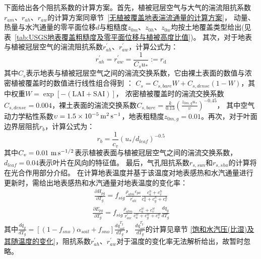 下面给出各个阻抗系数的计算方案。首先，植被冠层空气与大气的湍流阻抗系数$r_{am}$、$r_{ah}$、$r_{aw}$的计算方案同章节~\ref{无植被覆盖地表湍流通量的计算方案}，
动量、热量与水汽通量的零平面位移$d$与粗糙度$z_{0m}$、$z_{0h}$、$z_{0w}$均按土地覆盖类型给出(见
表~\ref{tab:USGS地表覆盖粗糙度及零平面位移与植被高度比值})。
其次，对于地表与植被冠层空气的湍流阻抗系数$r_{ah}^\prime$、$r_{aw}^\prime$，计算公式为：
\begin{equation}
r_{a h}^{\prime}=r_{a w}^{\prime}=\frac{1}{C_{s} u_{*}}:=r_{\mathrm{d}}
\end{equation}
其中$C_s$表示地表与植被冠层空气之间的湍流交换系数，它由裸土表面的数值与浓密植被覆盖时的数值进行线性组合得到 \citep{zeng2005vegetation}：
$C_s=C_{s,bare}W+C_{s,dense}\left(1-W\right)$，其中权重$W=\exp {\left[-(\text{LAI}+\text{SAI})\right]}$，
浓密植被覆盖时的湍流交换系数$C_{s,dense}=0.004$，裸土表面的湍流交换系数$C_{s,bare}=\frac{k}{0.13}\left(\frac{z_{0m,g}u_\ast}{\upsilon}\right)^{-0.45}$，
其中空气动力学粘性系数$\upsilon=1.5\times{10}^{-5}\,\rm m^2\,s^{-1}$，地表粗糙度$z_{0m,g}=0.01$。再次，对于叶面边界层阻抗$r_b$，计算公式为：
\begin{equation}
r_{b}=\frac{1}{c_{v}}\left(u_{*} / d_{{leaf }}\right)^{-0.5}
\end{equation}
其中$C_v=0.01\ \rm m\,s^{-1/2}$表示植被表面与植被冠层空气之间的湍流交换系数，$d_{leaf}=0.04$表示叶片在风向的特征值。
最后，气孔阻抗系数$r_{s,sun}$和$r_{s,sha}$的计算将在光合作用部分介绍。
在计算地表温度并基于该温度对地表感热和水汽通量进行更新时，需给出地表感热和水汽通量对地表温度的变化率：
\begin{equation}
\begin{array}{c} \frac{\partial H_{p g}}{\partial T_{g}}=f_{sig} \frac{\rho_{atm} c_{p a}}{r_{a h}^{\prime}} 
     \frac{c_{a}^{h}+c_{v}^{h}}{c_{a}^{h}+c_{g}^{h}+c_{v}^{h}}\end{array}
\end{equation}
\begin{equation}
\begin{array}{c}\frac{\partial E_{p g}}{\partial T_{g}}=f_{sig}
      \frac{\rho_{atm}}{r_{a w}^{\prime}} \frac{c_{a}^{w}+c_{v}^{w}}{c_{a}^{w}+c_{g}^{w}+c_{v}^{w}} \frac{d q_{g}}{d T_{g}}\end{array}
\end{equation}
其中$\frac{dq_g}{dT_g}=\left[\left(1-f_{sno}\right)\alpha_{soil}+f_{sno}\right]\frac{dq_{sat}^{T_g}}{dT_g}$，
$\frac{dq_{sat}^{T_g}}{dT_g}$的计算见章节 \ref{饱和水汽压(比湿)及其随温度的变化}，阻抗系数$r_{ah}^\prime$、$r_{aw}^\prime$对于温度的变化率无法解析给出，故暂时忽略。


